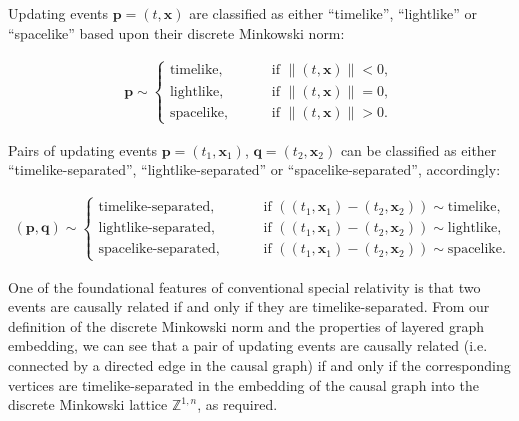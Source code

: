 \documentclass{article}
\begin{document}
\begin{definition}
Updating events ${\mathbf{p} = \left( t, \mathbf{x} \right)}$ are classified as either ``timelike'', ``lightlike'' or ``spacelike'' based upon their discrete Minkowski norm:

\begin{align}
\mathbf{p} \sim \begin{cases}
\text{timelike}, \qquad &\text{ if } \lVert \left( t, \mathbf{x} \right) \rVert < 0,\\
\text{lightlike}, \qquad &\text{ if } \lVert \left( t, \mathbf{x} \right) \rVert = 0,\\
\text{spacelike}, \qquad &\text{ if } \lVert \left( t, \mathbf{x} \right) \rVert > 0.
\end{cases}
\end{align}
\end{definition}

\begin{definition}
Pairs of updating events ${\mathbf{p} = \left( t_1, \mathbf{x}_1 \right)}$, ${\mathbf{q} = \left( t_2, \mathbf{x}_2 \right)}$ can be classified as either ``timelike-separated'', ``lightlike-separated'' or ``spacelike-separated'', accordingly:

\begin{align}
\left( \mathbf{p}, \mathbf{q} \right) \sim \begin{cases}
\text{timelike-separated}, \qquad &\text{ if } \left( \left( t_1, \mathbf{x}_1 \right) - \left( t_2, \mathbf{x}_2 \right) \right) \sim \text{timelike},\\
\text{lightlike-separated}, \qquad &\text{ if } \left( \left( t_1, \mathbf{x}_1 \right) - \left( t_2, \mathbf{x}_2 \right) \right) \sim \text{lightlike},\\
\text{spacelike-separated}, \qquad &\text{ if } \left( \left( t_1, \mathbf{x}_1 \right) - \left( t_2, \mathbf{x}_2 \right) \right) \sim \text{spacelike}.
\end{cases}
\end{align}
\end{definition}

One of the foundational features of conventional special relativity is that two events are causally related if and only if they are timelike-separated. From our definition of the discrete Minkowski norm and the properties of layered graph embedding, we can see that a pair of updating events are causally related (i.e. connected by a directed edge in the causal graph) if and only if the corresponding vertices are timelike-separated in the embedding of the causal graph into the discrete Minkowski lattice ${\mathbb{Z}^{1, n}}$, as required.
\end{document}
